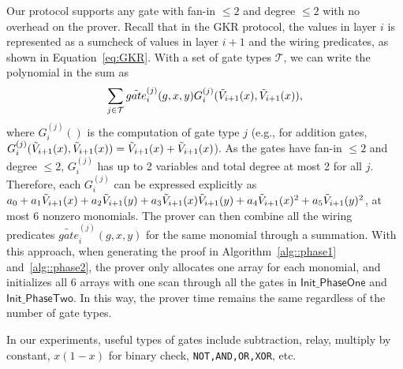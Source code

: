 Our protocol supports any gate with fan-in $\le 2$ and degree $\le 2$ with no overhead on the prover. Recall that in the GKR protocol, the values in layer $i$ is represented as a sumcheck of values in layer $i+1$ and the wiring predicates, as shown in Equation~\ref{eq:GKR}. With a set of gate types $\mathcal{T}$, we can write the polynomial in the sum as $$\sum_{j\in\mathcal{T}}\tilde{gate}^{(j)}_i(g,x,y) G^{(j)}_i(\tilde{V}_{i+1}(x),\tilde{V}_{i+1}(x)),$$ where $G^{(j)}_i()$ is the computation of gate type $j$ (e.g., for addition gates, \\$G^{(j)}_i(\tilde{V}_{i+1}(x),\tilde{V}_{i+1}(x)) = \tilde{V}_{i+1}(x)+\tilde{V}_{i+1}(x)$). As the gates have fan-in $\le 2$ and degree $\le 2$, $G^{(j)}_i$ has up to 2 variables and total degree at most 2 for all $j$. Therefore, each $G^{(j)}_i$ can be expressed explicitly as $a_0+a_1\tilde{V}_{i+1}(x)+a_2\tilde{V}_{i+1}(y)+a_3\tilde{V}_{i+1}(x)\tilde{V}_{i+1}(y)+a_4\tilde{V}_{i+1}(x)^2+a_5\tilde{V}_{i+1}(y)^2$, at most 6 nonzero monomials. The prover can then combine all the wiring predicates $\tilde{gate}^{(j)}_i(g,x,y)$ for the same monomial through a summation. With this approach, when generating the proof in Algorithm~\ref{alg::phase1} and~\ref{alg::phase2}, the prover only allocates one array for each monomial, and initializes all 6 arrays with one scan through all the gates in $\mathsf{Init\_PhaseOne}$ and $\mathsf{Init\_PhaseTwo}$. In this way, the prover time remains the same regardless of the number of gate types. 

In our experiments, useful types of gates include subtraction, relay, multiply by constant, $x(1-x)$ for binary check, \texttt{NOT,AND,OR,XOR}, etc. 